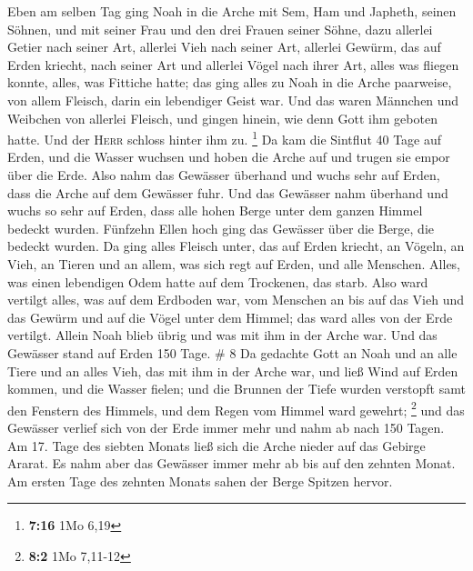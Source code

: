  Eben am selben Tag ging Noah in die Arche mit Sem, Ham
und Japheth, seinen Söhnen, und mit seiner Frau und den drei Frauen
seiner Söhne,  dazu allerlei Getier nach seiner Art,
allerlei Vieh nach seiner Art, allerlei Gewürm, das auf Erden kriecht,
nach seiner Art und allerlei Vögel nach ihrer Art, alles was fliegen
konnte, alles, was Fittiche hatte;  das ging alles zu
Noah in die Arche paarweise, von allem Fleisch, darin ein lebendiger
Geist war.  Und das waren Männchen und Weibchen von
allerlei Fleisch, und gingen hinein, wie denn Gott ihm geboten hatte.
Und der \textsc{Herr} schloss hinter ihm zu. \footnote{\textbf{7:16} 1Mo
  6,19}  Da kam die Sintflut 40 Tage auf Erden, und die
Wasser wuchsen und hoben die Arche auf und trugen sie empor über die
Erde.  Also nahm das Gewässer überhand und wuchs sehr auf
Erden, dass die Arche auf dem Gewässer fuhr.  Und das
Gewässer nahm überhand und wuchs so sehr auf Erden, dass alle hohen
Berge unter dem ganzen Himmel bedeckt wurden.  Fünfzehn
Ellen hoch ging das Gewässer über die Berge, die bedeckt wurden.
 Da ging alles Fleisch unter, das auf Erden kriecht, an
Vögeln, an Vieh, an Tieren und an allem, was sich regt auf Erden, und
alle Menschen.  Alles, was einen lebendigen Odem hatte
auf dem Trockenen, das starb.  Also ward vertilgt alles,
was auf dem Erdboden war, vom Menschen an bis auf das Vieh und das
Gewürm und auf die Vögel unter dem Himmel; das ward alles von der Erde
vertilgt. Allein Noah blieb übrig und was mit ihm in der Arche war.
 Und das Gewässer stand auf Erden 150 Tage. \# 8
 Da gedachte Gott an Noah und an alle Tiere und an alles
Vieh, das mit ihm in der Arche war, und ließ Wind auf Erden kommen, und
die Wasser fielen;  und die Brunnen der Tiefe wurden
verstopft samt den Fenstern des Himmels, und dem Regen vom Himmel ward
gewehrt; \footnote{\textbf{8:2} 1Mo 7,11-12}  und das
Gewässer verlief sich von der Erde immer mehr und nahm ab nach 150
Tagen.  Am 17. Tage des siebten Monats ließ sich die Arche
nieder auf das Gebirge Ararat.  Es nahm aber das Gewässer
immer mehr ab bis auf den zehnten Monat. Am ersten Tage des zehnten
Monats sahen der Berge Spitzen hervor.

